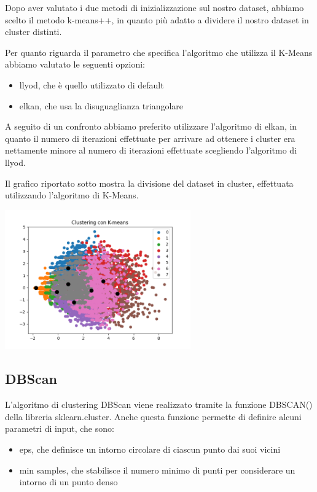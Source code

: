 \documentclass[a4paper, 10pt]{report}
\begin{document}
            Dopo aver valutato i due metodi di inizializzazione sul nostro dataset, abbiamo scelto il metodo k-means++, in quanto più adatto
            a dividere il nostro dataset in cluster distinti.

            Per quanto riguarda il parametro che specifica l'algoritmo che utilizza il K-Means abbiamo valutato le seguenti opzioni:
            \begin{itemize}
                \item llyod, che è quello utilizzato di default
                \item elkan, che usa la disuguaglianza triangolare
            \end{itemize}

            A seguito di un confronto abbiamo preferito utilizzare l'algoritmo di elkan, in quanto il numero di iterazioni effettuate per arrivare ad ottenere
            i cluster era nettamente minore al numero di iterazioni effettuate scegliendo l'algoritmo di llyod.

            Il grafico riportato sotto mostra la divisione del dataset in cluster, effettuata utilizzando l'algoritmo di K-Means.

            \begin{center}
                \includegraphics[width=8cm]{modelling/ClusterK-Means.png}\\
            \end{center}

            \subsection{DBScan}
            L'algoritmo di clustering DBScan viene realizzato tramite la funzione DBSCAN() della libreria sklearn.cluster.
            Anche questa funzione permette di definire alcuni parametri di input, che sono:
            \begin{itemize}
                \item eps, che definisce un intorno circolare di ciascun punto dai suoi vicini
                \item min samples, che stabilisce il numero minimo di punti per considerare un intorno di un punto denso
            \end{itemize}
\end{document}

